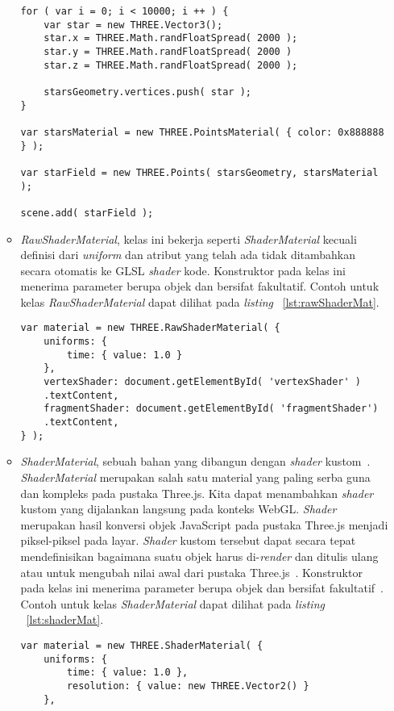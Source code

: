\begin{itemize}
\begin{itemize}
\begin{lstlisting}[caption={Contoh penggunaan kelas {\it PointsMaterial}.}, label={lst:pointsMat},captionpos=b]
for ( var i = 0; i < 10000; i ++ ) {
	var star = new THREE.Vector3();
	star.x = THREE.Math.randFloatSpread( 2000 );
	star.y = THREE.Math.randFloatSpread( 2000 )
	star.z = THREE.Math.randFloatSpread( 2000 );

	starsGeometry.vertices.push( star );
}

var starsMaterial = new THREE.PointsMaterial( { color: 0x888888 } );

var starField = new THREE.Points( starsGeometry, starsMaterial );

scene.add( starField );
\end{lstlisting}
		\item {\it RawShaderMaterial}, kelas ini bekerja seperti {\it ShaderMaterial} kecuali definisi dari {\it uniform} dan atribut yang telah ada tidak ditambahkan secara otomatis ke GLSL {\it shader} kode. Konstruktor pada kelas ini menerima parameter berupa objek dan bersifat fakultatif. Contoh untuk kelas {\it RawShaderMaterial} dapat dilihat pada {\it listing} ~\ref{lst:rawShaderMat}.
\begin{lstlisting}[caption={Contoh penggunaan kelas {\it RawShaderMaterial}.}, label={lst:rawShaderMat},captionpos=b]
var material = new THREE.RawShaderMaterial( {
    uniforms: {
        time: { value: 1.0 }
    },
    vertexShader: document.getElementById( 'vertexShader' )
    .textContent,
    fragmentShader: document.getElementById( 'fragmentShader')
    .textContent,
} );
\end{lstlisting}
		\item {\it ShaderMaterial}, sebuah bahan yang dibangun dengan {\it shader} kustom~\cite{threejs}. {\it ShaderMaterial} merupakan salah satu material yang paling serba guna dan kompleks pada pustaka Three.js. Kita dapat menambahkan {\it shader} kustom yang dijalankan langsung pada konteks WebGL. {\it Shader} merupakan hasil konversi objek JavaScript pada pustaka Three.js menjadi piksel-piksel pada layar. {\it Shader} kustom tersebut dapat secara tepat mendefinisikan bagaimana suatu objek harus di-{\it render} dan ditulis ulang atau untuk mengubah nilai awal dari pustaka Three.js~\cite{learningThreejs}. Konstruktor pada kelas ini menerima parameter berupa objek dan bersifat fakultatif~\cite{threejs}. Contoh untuk kelas {\it ShaderMaterial} dapat dilihat pada {\it listing} ~\ref{lst:shaderMat}.
\begin{lstlisting}[caption={Contoh penggunaan kelas {\it ShaderMaterial}.}, label={lst:shaderMat},captionpos=b]
var material = new THREE.ShaderMaterial( {
	uniforms: {
		time: { value: 1.0 },
		resolution: { value: new THREE.Vector2() }
	},


\end{lstlisting}
\end{itemize}
\end{itemize}
